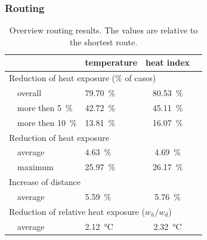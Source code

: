 \subsubsection{Routing}

\begin{table}
	\centering
	\begin{tabular}{lp{9.25cm}lcc}
		\hline
		& & temperature & heat index \\
		\hline
		\multicolumn{4}{l}{Reduction of heat exposure (\% of cases) }   \\
		& overall  & \SI{79.70}{\percent} & \SI{80.53}{\percent}  \\
		& more then \SI{5}{\percent} & \SI{42.72}{\percent} & \SI{45.11}{\percent} \\
		& more then \SI{10}{\percent} & \SI{13.81}{\percent} & \SI{16.07}{\percent} \\
		\multicolumn{4}{l}{Reduction of heat exposure}  \\
		& average  & \SI{4.63}{\percent} & \SI{4.69}{\percent}  \\
		& maximum  & \SI{25.97}{\percent} & \SI{26.17 }{\percent}  \\
		\multicolumn{4}{l}{Increase of distance}  \\
		& average & \SI{5.59}{\percent} & \SI{5.76}{\percent}  \\
		\multicolumn{4}{l}{Reduction of relative heat exposure ($w_h / w_d$)}  \\
		& average  & \SI{2.12}{\celsius} & \SI{2.32}{\celsius}  \\
		\hline
	\end{tabular}
	\caption{Overview routing results. The values are relative to the shortest route. \label{tab:results-routing}}
\end{table}

